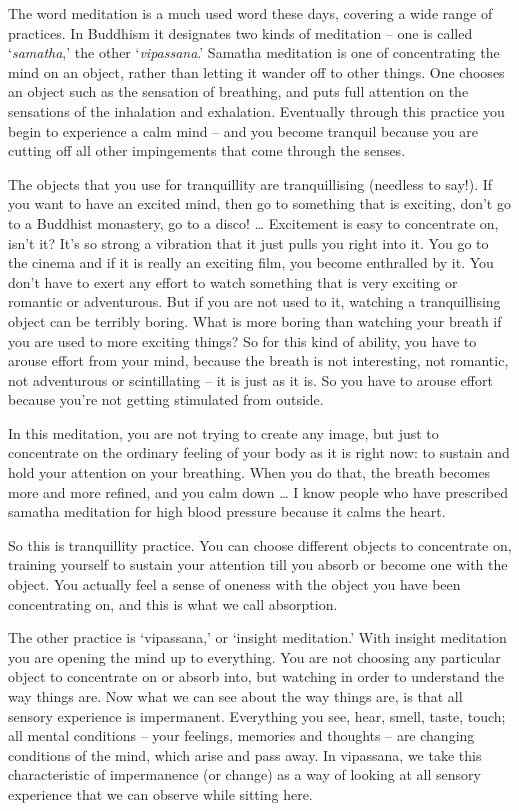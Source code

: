  
The word meditation is a much used word these days, covering a wide range of practices. In Buddhism it designates two kinds of meditation -- one is called `\textit{samatha},' the other `\textit{vipassana}.' Samatha meditation is one of concentrating the mind on an object, rather than letting it wander off to other things. One chooses an object such as the sensation of breathing, and puts full attention on the sensations of the inhalation and exhalation. Eventually through this practice you begin to experience a calm mind -- and you become tranquil because you are cutting off all other impingements that come through the senses.

The objects that you use for tranquillity are tranquillising (needless to say!). If you want to have an excited mind, then go to something that is exciting, don't go to a Buddhist monastery, go to a disco! \ldots{} Excitement is easy to concentrate on, isn't it? It's so strong a vibration that it just pulls you right into it. You go to the cinema and if it is really an exciting film, you become enthralled by it. You don't have to exert any effort to watch something that is very exciting or romantic or adventurous. But if you are not used to it, watching a tranquillising object can be terribly boring. What is more boring than watching your breath if you are used to more exciting things? So for this kind of ability, you have to arouse effort from your mind, because the breath is not interesting, not romantic, not adventurous or scintillating -- it is just as it is. So you have to arouse effort because you're not getting stimulated from outside.

In this meditation, you are not trying to create any image, but just to concentrate on the ordinary feeling of your body as it is right now: to sustain and hold your attention on your breathing. When you do that, the breath becomes more and more refined, and you calm down \ldots{} I know people who have prescribed samatha meditation for high blood pressure because it calms the heart.

So this is tranquillity practice. You can choose different objects to concentrate on, training yourself to sustain your attention till you absorb or become one with the object. You actually feel a sense of oneness with the object you have been concentrating on, and this is what we call absorption.

The other practice is `vipassana,' or `insight meditation.' With insight meditation you are opening the mind up to everything. You are not choosing any particular object to concentrate on or absorb into, but watching in order to understand the way things are. Now what we can see about the way things are, is that all sensory experience is impermanent. Everything you see, hear, smell, taste, touch; all mental conditions -- your feelings, memories and thoughts -- are changing conditions of the mind, which arise and pass away. In vipassana, we take this characteristic of impermanence (or change) as a way of looking at all sensory experience that we can observe while sitting here.

